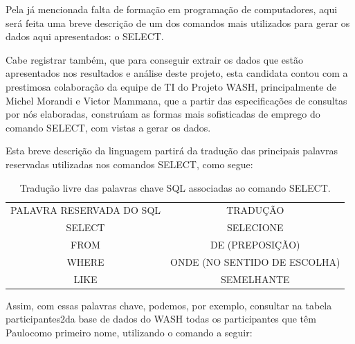\documentclass[
12pt,		%
openright,	%
twoside,  %
a4paper,			%
chapter=TITLE,		%
english,			%
french,				%
spanish,			%
brazil				%
]{USPSC-classe/USPSC_RedarTex}
\begin{document}
Pela j\'a mencionada falta de forma\c{c}\~ao em programa\c{c}\~ao de computadores, aqui ser\'a feita uma breve descri\c{c}\~ao de um dos comandos mais utilizados para gerar os dados aqui apresentados: o SELECT.








Cabe registrar tamb\'em, que para conseguir extrair os dados que est\~ao apresentados nos resultados e an\'alise deste projeto, esta candidata contou com a prestimosa colabora\c{c}\~ao da equipe de TI do Projeto WASH, principalmente de Michel Morandi e Victor Mammana, que a partir das especifica\c{c}\~oes de consultas por n\'os elaboradas, constru\'{\i}am as formas mais sofisticadas de emprego do comando SELECT, com vistas a gerar os dados.








Esta breve descri\c{c}\~ao da linguagem partir\'a da tradu\c{c}\~ao das principais palavras reservadas utilizadas nos comandos SELECT, como segue:












\begin{table}[Htb]
\tiny
\caption{\label{b76ad4c1cd41524988de11de144344a283ced9bb}Tradu\c{c}\~ao livre das palavras chave SQL associadas ao comando SELECT.}

\centering
\begin{tabular}{|c|c|}
\hline
PALAVRA RESERVADA DO SQL  &  TRADU\c{C}\~AO \\
SELECT  &  SELECIONE \\
FROM  &  DE (PREPOSI\c{C}\~AO) \\
WHERE  &  ONDE (NO SENTIDO DE ESCOLHA) \\
LIKE  &  SEMELHANTE \\
\hline
\end{tabular}
\end{table}


Assim, com essas palavras chave, podemos, por exemplo, consultar na tabela \textquotedbl participantes2\textquotedbl  da base de dados do WASH todas os participantes que t\^em \textquotedbl Paulo\textquotedbl  como primeiro nome, utilizando o comando a seguir:
\end{document}
